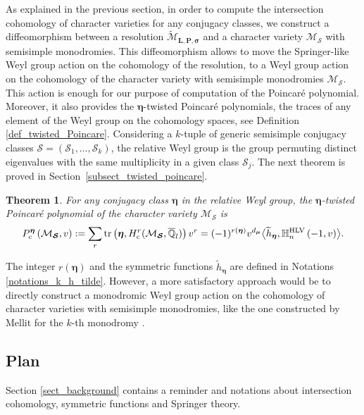 \documentclass[JEP,XML,SOM,NoEqCountersInSection,Unicode,published]{cedram}
\newcommand{\rc}{\mathrm{c}}
\newcommand{\HLV}{\textup{HLV}}
\newcommand{\blangle}{\bigl\langle}
\newcommand{\brangle}{\bigr\rangle}
\theoremstyle{definition}
\theoremstyle{plain}
\newtheorem{theorem}[definition]{Theorem}
\DeclareMathOperator{\tr}{tr}
\newcommand{\qlbar}{\overline{\mathbb{Q}}_l}
\newcommand{\mlps}{\widetilde{\mathcal{M}}_{\boldsymbol{L},\boldsymbol{P},\boldsymbol{\sigma}}}
\begin{document}
As explained in the previous section, in order to compute the intersection cohomology of character varieties for any conjugacy classes, we construct a diffeomorphism between a resolution $\mlps$ and a character variety $\mathcal{M}_{\boldsymbol{\mathcal{S}}}$ with semisimple monodromies. This diffeomorphism allows to move the Springer-like Weyl group action on the cohomology of the resolution, to a Weyl group action on the cohomology of the character variety with semisimple monodromies $\mathcal{M}_{\boldsymbol{\mathcal{S}}}$. This action is enough for our purpose of computation of the Poincaré polynomial. Moreover, it also provides the $\boldsymbol{\eta}$-twisted Poincaré polynomials, \ie the traces of any element of the Weyl group on the cohomology spaces, see Definition \ref{def_twisted_Poincare}. Considering a $k$-tuple of generic semisimple conjugacy classes $\boldsymbol{\mathcal{S}}=\left(\mathcal{S}_1,\dots,\mathcal{S}_k\right)$, the relative Weyl group is the group permuting distinct eigenvalues with the same multiplicity in a given class $\mathcal{S}_j$. The next theorem is proved in Section~\ref{subsect_twisted_poincare}.
\begin{theorem}\label{th_twisted_intro}
For any conjugacy class $\boldsymbol{\eta}$ in the relative Weyl group, the $\boldsymbol{\eta}$-twisted Poincaré polynomial of the character variety $\mathcal{M}_{\boldsymbol{\mathcal{S}}}$ is
\[
P_{\rc}^{\boldsymbol{\eta}}\left(\mathcal{M}_{\boldsymbol{\mathcal{S}}},v\right) :=\sum_{r} \tr\left(\boldsymbol{\eta},H_\rc^r(\mathcal{M}_{\boldsymbol{\mathcal{S}}}, \qlbar)\right)v^r = (-1)^{r(\boldsymbol{\eta})}v^{d_{\boldsymbol{\mu}}}\blangle \widetilde{h}_{\boldsymbol{\eta}},\mathbb{H}_n^{\HLV}\left(-1,v\right)\brangle.
\]
\end{theorem}

The integer $r(\boldsymbol{\eta})$ and the symmetric functions $\widetilde{h}_{\boldsymbol{\eta}}$ are defined in Notations \ref{notations_k_h_tilde}. However, a more satisfactory approach would be to directly construct a monodromic Weyl group action on the cohomology of character varieties with semisimple monodromies, like the one constructed by Mellit for the $k$-th monodromy \cite{Mellit2019}.

\subsection{Plan}
Section \ref{sect_background} contains a reminder and notations about intersection cohomology, symmetric functions and Springer theory.
\end{document}
